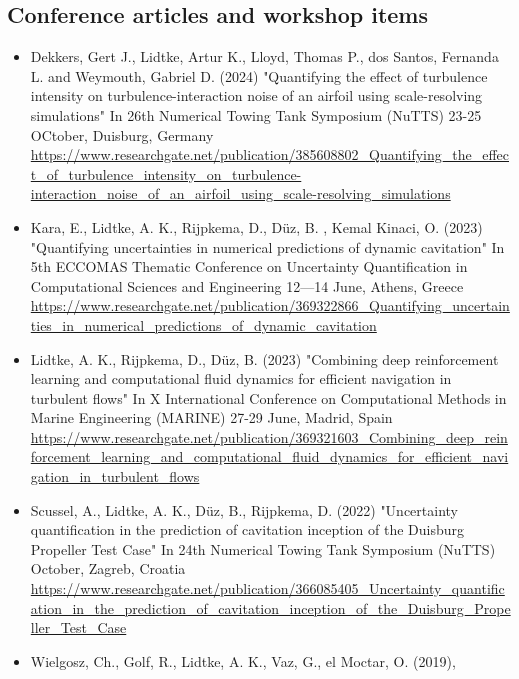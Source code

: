 \documentclass[a4paper,10pt]{article}
\begin{document}
\subsection{Conference articles and workshop items}
%
\begin{itemize}
%
\item Dekkers, Gert J., Lidtke, Artur K., Lloyd, Thomas P., dos Santos, Fernanda L. and Weymouth, Gabriel D. (2024)
	"Quantifying the effect of turbulence intensity on turbulence-interaction noise of an airfoil using scale-resolving simulations"
	In 26th Numerical Towing Tank Symposium (NuTTS)
	23-25 OCtober, Duisburg, Germany
	\cite{dekkers_quantifying_2024}
	\\ \url{https://www.researchgate.net/publication/385608802_Quantifying_the_effect_of_turbulence_intensity_on_turbulence-interaction_noise_of_an_airfoil_using_scale-resolving_simulations}
%
\item Kara, E., Lidtke, A. K., Rijpkema, D.,  D{\"u}z, B. , Kemal Kinaci, O. (2023)
	"Quantifying uncertainties in numerical predictions of dynamic cavitation"
	In 5th ECCOMAS Thematic Conference on Uncertainty Quantification in Computational Sciences and Engineering
	12—14 June, Athens, Greece
	\cite{kara_quantifying_2023}
	\\ \url{https://www.researchgate.net/publication/369322866_Quantifying_uncertainties_in_numerical_predictions_of_dynamic_cavitation}
%
\item  Lidtke, A. K., Rijpkema, D.,  D{\"u}z, B. (2023)
	"Combining deep reinforcement learning and computational fluid dynamics for efficient navigation in turbulent flows"
	In X International Conference on Computational Methods in Marine Engineering (MARINE)
	27-29 June, Madrid, Spain
	\cite{lidtke_combining_2023}
	\\ \url{https://www.researchgate.net/publication/369321603_Combining_deep_reinforcement_learning_and_computational_fluid_dynamics_for_efficient_navigation_in_turbulent_flows}
%
\item Scussel, A., Lidtke, A. K., D{\"u}z, B., Rijpkema, D. (2022)
	"Uncertainty quantification in the prediction of cavitation inception of the Duisburg Propeller Test Case"
	In 24th Numerical Towing Tank Symposium (NuTTS)
	October, Zagreb, Croatia
	\cite{scussel_uncertainty_2022}
	\\ \url{https://www.researchgate.net/publication/366085405_Uncertainty_quantification_in_the_prediction_of_cavitation_inception_of_the_Duisburg_Propeller_Test_Case}
%
\item Wielgosz, Ch., Golf, R., Lidtke, A. K., Vaz, G., el Moctar, O. (2019),

\end{itemize}
\end{document}
